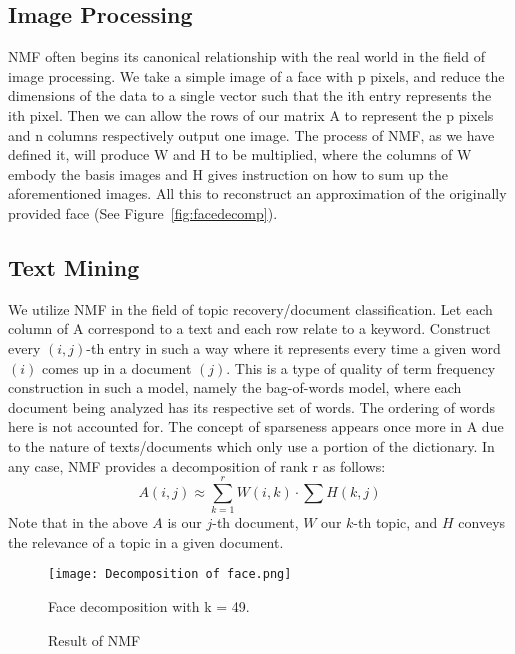 \documentclass[
10pt, %
a4paper, %
oneside, %
headinclude,footinclude, %
BCOR5mm, %
]{scrartcl}
\begin{document}
\subsection{Image Processing}
NMF often begins its canonical relationship with the real world in the field of image processing. We take a simple image of a face with p pixels, and reduce the dimensions of the data to a single vector such that the ith entry represents the ith pixel. Then we can allow the rows of our matrix A to represent the p pixels and n columns respectively output one image. The process of NMF, as we have defined it, will produce W and H to be multiplied, where the columns of W embody the basis images and H gives instruction on how to sum up the aforementioned images. All this to reconstruct an approximation of the originally provided face (See Figure~\vref{fig:facedecomp}).

\subsection{Text Mining}
We utilize NMF in the field of topic recovery/document classification.
Let each column of A correspond to a text and each row relate to a keyword.
Construct every $(i,j)$-th entry in such a way where it represents every time a given word $(i)$ comes up in a document $(j)$.
This is a type of quality of term frequency construction in such a model, namely the bag-of-words model, where each document being analyzed has its respective set of words.
The ordering of words here is not accounted for.
The concept of sparseness appears once more in A due to the nature of texts/documents which only use a portion of the dictionary.
In any case, NMF provides a decomposition of rank r as follows:
$$A(i,j)\approx\sum_{k=1}^{r}W(i,k)\cdot\sum H(k,j)$$
Note that in the above $A$ is our $j$-th document, $W$ our $k$-th topic, and $H$ conveys the relevance of a topic in a given document.



\begin{figure}[tb]
    \centering
    \texttt{[image: Decomposition of face.png]}
    \caption[Face Decomposition Using NMF]{Face decomposition with k = 49.}
    \label{fig:facedecomp}
\end{figure}

\begin{figure}[tb]
    \centering
    \caption{Result of NMF}
    \label{fig:application}
\end{figure}
\end{document}
